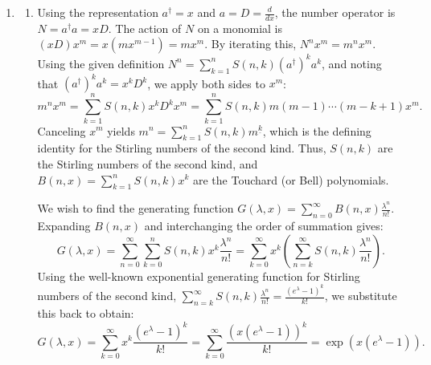 \documentclass{article}
\begin{document}
\begin{enumerate}[label=\fbox{\arabic*}]
  \item %
        \begin{enumerate}[label=(\roman*)]
          \item Using the representation $a^\dagger = x$ and $a = D = \frac{d}{dx}$, the number operator is $N = a^\dagger a = x D$.
          The action of $N$ on a monomial is $(x D) x^m = x (m x^{m-1}) = m x^m$. By iterating this, $N^n x^m = m^n x^m$.
          Using the given definition $N^n = \sum_{k=1}^n S(n, k) (a^\dagger)^k a^k$, and noting that $(a^\dagger)^k a^k = x^k D^k$, we apply both sides to $x^m$:
          \[
            m^n x^m = \sum_{k=1}^n S(n, k) x^k D^k x^m = \sum_{k=1}^n S(n, k) m(m-1)\cdots(m-k+1) x^m.
          \]
          Canceling $x^m$ yields $m^n = \sum_{k=1}^n S(n, k) m^{\underline{k}}$, which is the defining identity for the Stirling numbers of the second kind. Thus, $S(n, k)$ are the Stirling numbers of the second kind, and $B(n, x) = \sum_{k=1}^n S(n, k) x^k$ are the Touchard (or Bell) polynomials.
          
          We wish to find the generating function $G(\lambda, x) = \sum_{n=0}^\infty B(n, x) \frac{\lambda^n}{n!}$.
          Expanding $B(n, x)$ and interchanging the order of summation gives:
          \[
            G(\lambda, x) = \sum_{n=0}^\infty \sum_{k=0}^n S(n, k) x^k \frac{\lambda^n}{n!} = \sum_{k=0}^\infty x^k \left( \sum_{n=k}^\infty S(n, k) \frac{\lambda^n}{n!} \right).
          \]
          Using the well-known exponential generating function for Stirling numbers of the second kind, $\sum_{n=k}^\infty S(n, k) \frac{\lambda^n}{n!} = \frac{(e^\lambda - 1)^k}{k!}$, we substitute this back to obtain:
          \[
            G(\lambda, x) = \sum_{k=0}^\infty x^k \frac{(e^\lambda - 1)^k}{k!} = \sum_{k=0}^\infty \frac{\left( x(e^\lambda - 1) \right)^k}{k!} = \exp(x(e^\lambda - 1)).
          \]


\end{enumerate}
\end{enumerate}
\end{document}
